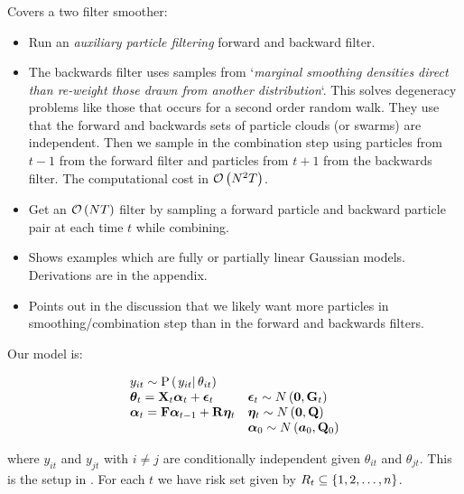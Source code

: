 \subsubsection*{\cite{fearnhead10}}
Covers a two filter smoother:
\begin{itemize}
	\item Run an \emph{auxiliary particle filtering} forward and backward filter.
	\item The backwards filter uses samples from `\textit{marginal smoothing densities direct than re-weight those drawn from another distribution}`. This solves degeneracy problems  like those that occurs for a second order random walk. They use that the forward and backwards sets of particle clouds (or swarms) are independent. Then we sample in the combination step using particles from $t-1$ from the forward filter and particles from $t + 1$ from the backwards filter. The computational cost in $\mathcal{O}\left( N^2T\right)$.
	\item Get an $\mathcal{O}\left( NT\right)$ filter by sampling a forward particle and backward particle pair at each time $t$ while combining.
	\item Shows examples which are fully or partially linear Gaussian models. Derivations are in the appendix.
	\item Points out in the discussion that we likely want more particles in smoothing/combination step than in the forward and backwards filters.
\end{itemize}
\fi



\iffalse
Our model is:

\begin{equation}
\begin{array}{ll}
 	y_{it} \sim \propC{y_{it}}{\theta_{it}} & \\
%
 	\vec{\theta}_{t} = \mat{X}_t\vec{\alpha}_t + \vec{\epsilon}_t & 
  		\vec{\epsilon}_t \sim N\Lparen{\vec{0}, \mat{G}_t} \\
% 
 	\vec{\alpha}_t = \mat{F}\vec{\alpha}_{t - 1} + \mat{R}\vec{\eta}_t &
 		\vec{\eta}_t \sim N\Lparen{\vec{0}, \mat{Q}} \\
%
	&	\vec{\alpha}_0 \sim N\Lparen{\vec{a}_0, \mat{Q}_0}
 \end{array}
\end{equation}

where $y_{it}$ and $y_{jt}$ with $i\neq j$ are conditionally independent given $\theta_{it}$ and $\theta_{jt}$. This is the setup in \cite{andrieu02}. For each $t$ we have risk set given by $R_t \subseteq \left\{ 1,2,\dots,n\right\}$.

